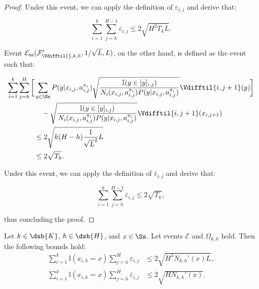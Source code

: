 \begin{proof}
Under this event, we can apply the definition of $\varepsilon_{i,j}$ and derive that:

\begin{equation*}
    \sum_{i=1}^k \sum_{j=h}^{H-1} \varepsilon_{i,j} \le 2 \sqrt{H^2 T_k L}.
\end{equation*}

Event $\mathcal{E}_{\mathrm{az}}(\mathcal{F}_{\Vdifftil{}, k, h}', 1/\sqrt{L}, L)$, on the other hand, is defined as the event such that:

\begin{align*}
    \sum_{i=1}^k \sum_{j=h}^H \bigg[ &\sum_{y\in\Ss} P(y|x_{i,j},a_{i,j}^{\pi_i}) \sqrt{\frac{\mathbb{I}(y \in [y]_{i,j})}{N_i(x_{i,j},a_{i,j}^{\pi_i})P(y|x_{i,j},a_{i,j}^{\pi_i})}} \Vdifftil{i,j+1}(y) \bigg] \\
    &\quad - \sqrt{\frac{\mathbb{I}(y \in [y]_{i,j})}{N_i(x_{i,j},a_{i,j}^{\pi_i})P(y|x_{i,j},a_{i,j}^{\pi_i})}} \Vdifftil{i,j+1}(x_{i,j+1}) \\
    &\le 2 \sqrt{k(H-h) \frac{1}{\sqrt{L}^2} L} \\
    &\le 2 \sqrt{T_k}.
\end{align*}

Under this event, we can apply the definition of $\overline{\varepsilon}_{i,j}$ and derive that:

\begin{equation*}
    \sum_{i=1}^k \sum_{j=h}^{H-1} \overline{\varepsilon}_{i,j} \le 2 \sqrt{T_k},
\end{equation*}

thus concluding the proof.
\end{proof}


\begin{lemma}
\label{lem:sum_eps_x}
    Let $k \in \dsb{K}$, $h \in \dsb{H}$, and $x \in \Ss$. Let events $\mathcal{E}$ and $\Omega_{k,h}$ hold. Then the following bounds hold:
    \begin{align*}
        \sum_{i=1}^k \mathbb{I}(x_{i,h}=x) \sum_{j=h}^H \varepsilon_{i,j} &\le 2\sqrt{H^3 N_{k,h}'(x) L}, \\
        \sum_{i=1}^k \mathbb{I}(x_{i,h}=x) \sum_{j=h}^H \overline{\varepsilon}_{i,j} &\le 2 \sqrt{H N_{k,h}'(x)}.
    \end{align*}
\end{lemma}

